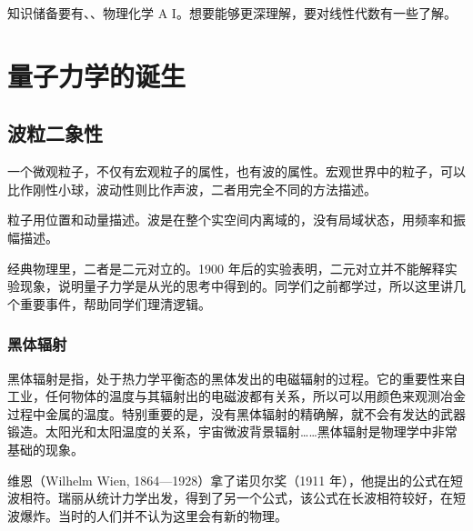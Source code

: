 知识储备要有、、物理化学 A I。想要能够更深理解，要对线性代数有一些了解。

\chapter{量子力学的诞生}


\section{波粒二象性}

一个微观粒子，不仅有宏观粒子的属性，也有波的属性。宏观世界中的粒子，可以比作刚性小球，波动性则比作声波，二者用完全不同的方法描述。

粒子用位置和动量描述。波是在整个实空间内离域的，没有局域状态，用频率和振幅描述。

经典物理里，二者是二元对立的。1900 年后的实验表明，二元对立并不能解释实验现象，说明量子力学是从光的思考中得到的。同学们之前都学过，所以这里讲几个重要事件，帮助同学们理清逻辑。

\subsection{黑体辐射}
黑体辐射是指，处于热力学平衡态的黑体发出的电磁辐射的过程。它的重要性来自工业，任何物体的温度与其辐射出的电磁波都有关系，所以可以用颜色来观测冶金过程中金属的温度。特别重要的是，没有黑体辐射的精确解，就不会有发达的武器锻造。太阳光和太阳温度的关系，宇宙微波背景辐射……黑体辐射是物理学中非常基础的现象。

维恩（Wilhelm Wien, 1864---1928）拿了诺贝尔奖（1911 年），他提出的公式在短波相符。瑞丽从统计力学出发，得到了另一个公式，该公式在长波相符较好，在短波爆炸。当时的人们并不认为这里会有新的物理。

